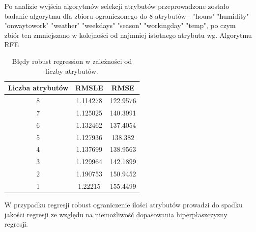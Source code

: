 \documentclass[a4paper,12pt]{article}
\begin{document}
Po analizie wyjścia algorytmów selekcji atrybutów przeprowadzone zostało badanie algorytmu dla zbioru ograniczonego do 8 atrybutów - "hours"    "humidity"  "onwaytowork" "weather" "weekdays"  "season" "workingday"  "temp", po czym zbiór ten zmniejszano w kolejności od najmniej istotnego atrybutu wg. Algorytmu RFE
    
    \begin{table}
    	\centering
        \begin{tabular}{|c|c|c|}
                \hline
                Liczba atrybutów & RMSLE & RMSE \\
                \hline
                8 & 1.114278 & 122.9576 \\
                \hline
                7 & 1.125025 & 140.3991 \\
                \hline
                6 & 1.132462 & 137.4054 \\
                \hline
                5 & 1.127936 & 138.382 \\
                \hline
                4 & 1.137699 & 138.9563 \\
                \hline
                3 & 1.129964 & 142.1899 \\
                \hline
                2 & 1.190753 & 150.9452 \\
                \hline
                1 & 1.22215 & 155.4499 \\
                \hline
        \end{tabular}
        \caption{Błędy robust regression w zależności od liczby atrybutów.}
    \end{table}
    
    W przypadku regresji robust ograniczenie ilości atrybutów prowadzi do spadku jakości regresji ze względu na niemożliwość dopasowania hiperpłaszczyzny regresji.
    
\end{document}
